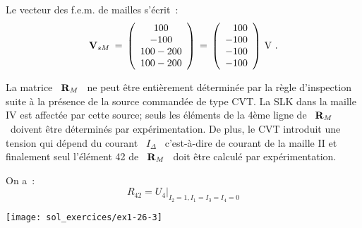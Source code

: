 Le vecteur des f.e.m. de mailles s'écrit~:
\[ {\bf V}_{sM} \: = \, 
\left( \begin{array}{c}
100\\ -100 \\ 100-200 \\ 100-200 
\end{array} \right)
\, = \, 
\left( \begin{array}{r}
100\\ -100 \\ -100 \\ -100 
\end{array} \right)\,\text{V~.} \]

La matrice \ ${\bf R}_M$ \ ne peut être entièrement déterminée par la
règle d'inspection suite à la présence de la source commandée de type
CVT. La SLK dans la maille IV est affectée par cette source; seuls les
éléments de la 4ème ligne de \ ${\bf R}_M$ \ doivent être déterminés
par expérimentation. De plus, le CVT introduit une tension qui dépend
du courant \ $I_{\Delta}$ \ c'est-à-dire de courant de la maille II et
finalement seul l'élément 42 de \ ${\bf R}_M$ \ doit être calculé par
expérimentation.

On a~:
\[R_{42}=U_4|_{I_2=1,I_1=I_3=I_4=0}\]
\begin{center}
	\texttt{[image: sol\_exercices/ex1-26-3]}
\end{center}

